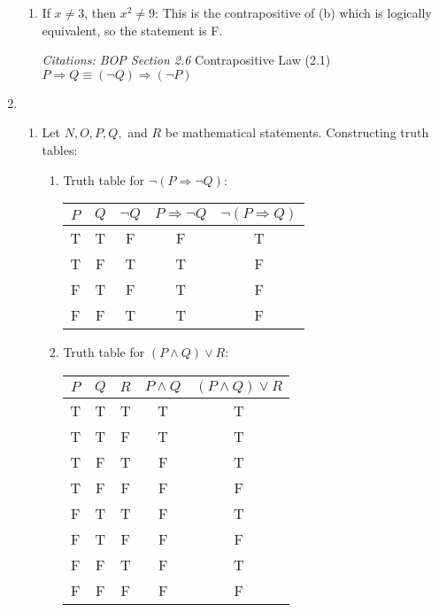 \documentclass[11pt]{article}
\begin{document}
\begin{enumerate}
\begin{enumerate}
    \item If $x \neq 3$, then $x^2 \neq 9$:
    This is the contrapositive of (b) which is logically equivalent, so the statement is F.

    \textit{Citations: BOP Section 2.6}
    Contrapositive Law (2.1) $P \Rightarrow Q \equiv (\neg Q) \Rightarrow (\neg P)$
  \end{enumerate}

  \newpage
  \item 
  \begin{enumerate}
    \item Let $N, O, P, Q,$ and $R$ be mathematical statements. Constructing truth tables:
    \begin{enumerate}
      \item Truth table for $\neg(P \Rightarrow \neg Q)$:
      \begin{center}
        \begin{tabular}{|c|c|c|c|c|}
          \hline
          $P$ & $Q$ & $\neg Q$ & $P \Rightarrow \neg Q$ & $\neg(P \Rightarrow Q)$ \\
          \hline
          T & T & F & F & T \\
          T & F & T & T & F \\
          F & T & F & T & F \\
          F & F & T & T & F \\
          \hline
        \end{tabular}
      \end{center}
      \item Truth table for $(P \land Q) \lor R$:
      \begin{center}
        \begin{tabular}{|c|c|c|c|c|}
          \hline
          $P$ & $Q$ & $R$ & $P \land Q$ & $(P \land Q) \lor R$ \\
          \hline
          T & T & T & T & T \\
          T & T & F & T & T \\
          T & F & T & F & T \\
          T & F & F & F & F \\
          F & T & T & F & T \\
          F & T & F & F & F \\
          F & F & T & F & T \\
          F & F & F & F & F \\
          \hline
        \end{tabular}
      \end{center}
    \end{enumerate}


\end{enumerate}
\end{enumerate}
\end{document}
